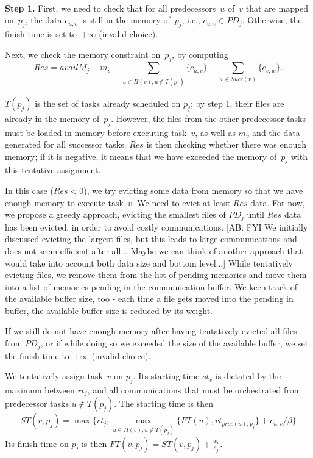 \documentclass[conference]{IEEEtran}
\newcommand{\PD}{PD}
\newcommand{\AB}[1]{{\color{purple}[AB: #1]}}
\begin{document}
    \medskip
    \\
    {\bf Step 1.} First, we need to check that for all predecessors~$u$ of~$v$ that are mapped
    on~$p_j$, the data $c_{u,v}$ is still in the memory of~$p_j$,
    i.e., $c_{u,v}\in PD_j$. Otherwise, the finish time is set to~$+\infty$ (invalid choice).

    \smallskip
     Next, we check the memory constraint on~$p_j$, by computing
    \[Res = availM_j - m_v - \sum_{u \in \Pi(v), u\notin T(p_j)}  \{c_{u,v}\}
    - \sum_{w\in Succ(v)}  \{c_{v,w}\}.\]

    $T(p_j)$ is the set of tasks already scheduled on $p_j$; by step 1, their files are
    already in the memory of~$p_j$. However, the files from the
    other predecessor tasks must be loaded in memory before executing task~$v$,
    as well as $m_v$ and the data generated for all successor tasks.
    $Res$ is then checking whether there was enough memory; if it is negative,
    it means that we have exceeded the memory of~$p_j$ with this tentative
    assignment.

    In this case ($Res <0$), we try evicting
    some data from memory so that we have enough memory to execute task~$v$.
    We need to evict at least $Res$ data.
    For now, we propose a greedy approach, evicting the smallest files of $\PD_j$ until $Res$ data has been evicted,
    in order to avoid costly communications.
    \AB{FYI We initially discussed evicting the largest files, but this leads to
    large communications and does not seem efficient after all... Maybe we can think of another
    approach that would take into account both data size and bottom level...}
    While tentatively evicting files, we remove them from the list of pending memories and move them into a list
    of memories pending in the communication buffer.
    We keep track of the available buffer size, too - each time a file gets moved into the pending in buffer, the available buffer size is reduced by its weight.

    If we still do not have enough memory after having tentatively evicted all files from $\PD_j$,
    or if while doing so we exceeded the size of the available buffer,
    we set the finish time to~$+\infty$ (invalid choice).

    \smallskip
     We tentatively assign task~$v$ on $p_j$.
    Its starting time $st_v$ is dictated by the maximum between $rt_j$, and all communications that
    must be orchestrated from predecessor tasks $u\notin T(p_j)$.
    The starting time is then
    \[ST(v, p_j) = \max{ \{rt_j, \max_{ u \in \Pi(v), u\notin T(p_j)}\{ FT(u) , rt_{proc(u), p_j}\} + c_{u,v} / \beta \} } \]
    Its finish time on $p_j$ is then
    $FT(v,p_j) = ST(v, p_j) + \frac{w_v}{s_j}$.
\end{document}
